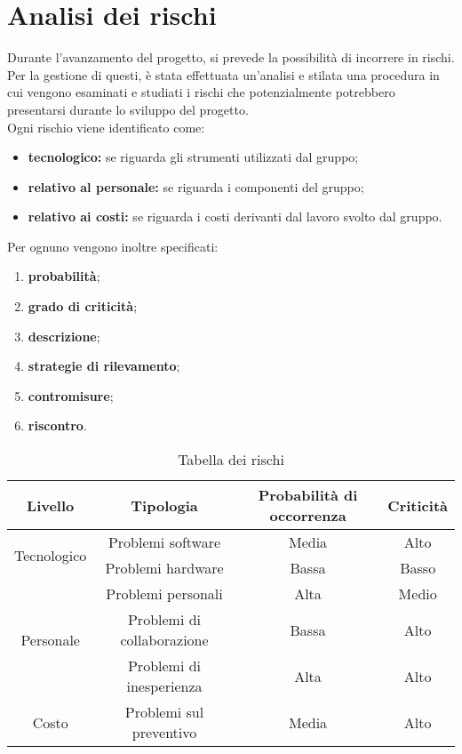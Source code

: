 \section{Analisi dei rischi}
Durante l'avanzamento del progetto, si prevede la possibilità di incorrere in rischi. Per la gestione di questi, è stata effettuata un'analisi e stilata una procedura in cui vengono esaminati e studiati i rischi che potenzialmente potrebbero presentarsi durante lo sviluppo del progetto. \\
Ogni rischio viene identificato come:
\begin{itemize}
\item \textbf{tecnologico:} se riguarda gli strumenti utilizzati dal gruppo;
\item \textbf{relativo al personale:} se riguarda i componenti del gruppo;
\item \textbf{relativo ai costi:} se riguarda i costi derivanti dal lavoro svolto dal gruppo.
\end{itemize}
Per ognuno vengono inoltre specificati:
\begin{enumerate}
	\item \textbf{probabilità};
	\item \textbf{grado di criticità};
	\item \textbf{descrizione};
	\item \textbf{strategie di rilevamento};
	\item \textbf{contromisure};
	\item \textbf{riscontro}.
\end{enumerate}

\begin{table}[H]
	\centering
	\begin{tabular}{|c|c|c|c|}
		\hline
		\textbf{Livello} &
		\textbf{Tipologia} &
		\textbf{Probabilità di occorrenza} &
		\textbf{Criticità}\\
		\hline
		\multirow{2}{*}{Tecnologico} & Problemi software & Media & Alto \\\cline{2-4}
									  & Problemi hardware & Bassa & Basso \\
		\hline
		\multirow{3}{*}{Personale} & Problemi personali & Alta & Medio \\\cline{2-4}
								   & Problemi di collaborazione & Bassa & Alto \\\cline{2-4}
								   & Problemi di inesperienza & Alta & Alto \\
		\hline
		Costo &  Problemi sul preventivo & Media & Alto \\
		\hline
	\end{tabular}
	\caption{Tabella dei rischi}
\end{table}

